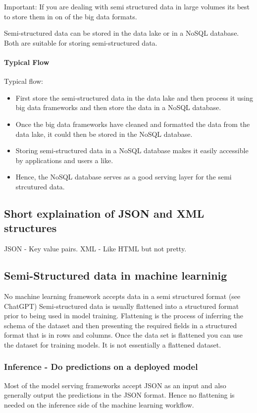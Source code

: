 \begin{note}
    Important: If you are dealing with semi structured data in large volumes its best to store them in on of the big data formats.
\end{note}

Semi-structured data can be stored in the data lake or in a NoSQL database.
Both are suitable for storing semi-structured data.

\paragraph{Typical Flow}
Typical flow:
\begin{itemize}
    \item First store the semi-structured data in the data lake and then process it using big data frameworks and then store the data in a NoSQL database.
    \item Once the big data frameworks have cleaned and formatted the data from the data lake, it could then be stored in the NoSQL database.
    \item Storing semi-structured data in a NoSQL database makes it easily accessible by applications and users a like.
    \item Hence, the NoSQL database serves as a good serving layer for the semi strcutured data.
\end{itemize}

\subsection{Short explaination of JSON and XML structures}
JSON - Key value pairs.
XML - Like HTML but not pretty.

\subsection{Semi-Structured data in machine learninig}
No machine learning framework accepts data in a semi structured format (see ChatGPT)
Semi-structured data is usually flattened into a structured format prior to being used in model training.
Flattening is the process of inferring the schema of the dataset and then presenting the required fields in a structured format that is in rows and columns.
Once the data set is flattened you can use the dataset for training models.
It is not essentially a flattened dataset.

\subsubsection{Inference - Do predictions on a deployed model}

Most of the model serving frameworks accept JSON as an input and also generally output the predictions in the JSON format.
Hence no flattening is needed on the inference side of the machine learning workflow.


